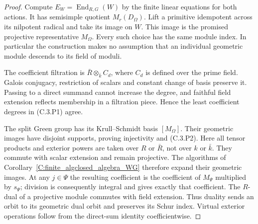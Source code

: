 \begin{proof}
Compute $E_W=\operatorname{End}_{R,G}(W)$ by the finite linear
equations for both actions. It has semisimple quotient
$M_r(D_\Omega)$. Lift a primitive idempotent across its
nilpotent radical and take its image on $W$.
This image is the promised projective representative
$M_\Omega$. Every such choice has the same module index.
In particular the construction makes no assumption that an
individual geometric module descends to its field of moduli.

The coefficient filtration is $\bar R\otimes_{\bar k}C_d$,
where $C_d$ is defined over the prime field.
Galois conjugacy, restriction of scalars and constant change
of basis preserve it. Passing to a direct summand cannot
increase the degree, and faithful field extension reflects
membership in a filtration piece. Hence the least coefficient
degrees in (C.3.P1) agree.

The split Green group has its Krull--Schmidt basis
$[M_\Omega]$. Their geometric images have disjoint supports,
proving injectivity and (C.3.P2). Here all tensor products and
exterior powers are taken over $R$ or $\bar R$, not over
$k$ or $\bar k$. They commute with scalar extension and
remain projective. The algorithms of
Corollary~\ref{C:finite_algclosed_algebra_WG} therefore expand
their geometric images. At any $j\in\Psi$ the resulting
coefficient is the coefficient of $M_\Psi$ multiplied by
$s_\Psi$; division is consequently integral and gives exactly
that coefficient. The $R$-dual of a projective module commutes
with field extension. Thus duality sends an orbit to its
geometric dual orbit and preserves its Schur index.
Virtual exterior operations follow from the direct-sum
identity coefficientwise.
\end{proof}

